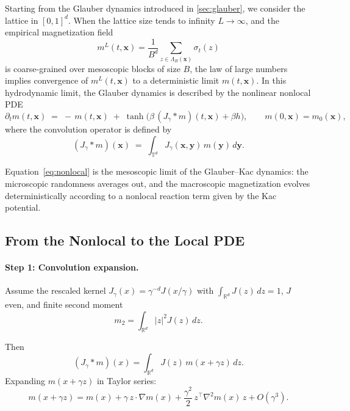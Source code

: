 \documentclass[11pt,a4paper]{article}
\begin{document}
Starting from the Glauber dynamics introduced in \cref{sec:glauber}, we consider the lattice in $[0,1]^d$. When the lattice size tends to infinity $L\to\infty$, and the empirical magnetization field
\begin{equation}
    m^L(t,\mathbf{x}) = \frac{1}{B^d}\sum_{z\in \Lambda_B(\mathbf{x})} \sigma_t(z)
\end{equation}
is coarse-grained over mesoscopic blocks of size $B$, the law of large numbers implies convergence of $m^L(t,\mathbf{x})$ to a deterministic limit $m(t,\mathbf{x})$. 
In this hydrodynamic limit, the Glauber dynamics is described by the nonlinear nonlocal PDE
\begin{equation}\label{eq:nonlocal}
    \partial_t m(t,\mathbf{x}) \;=\; -\,m(t,\mathbf{x})\;+\;\tanh\!\Big(\beta\, (J_\gamma * m)(t,\mathbf{x}) + \beta h\Big), 
    \qquad m(0,\mathbf{x})=m_0(\mathbf{x}),
\end{equation}
where the convolution operator is defined by
\begin{equation}
    \label{eq:convolution}
    (J_\gamma * m)(\mathbf{x}) \;=\; \int_{\mathbb{T}^d} J_\gamma(\mathbf{x},\mathbf{y})\,m(\mathbf{y})\,d\mathbf{y}.
\end{equation}

Equation~\eqref{eq:nonlocal} is the mesoscopic limit of the Glauber--Kac dynamics: 
the microscopic randomness averages out, and the macroscopic magnetization evolves deterministically according to a nonlocal reaction term given by the Kac potential.

\subsection{From the Nonlocal to the Local PDE}\paragraph{Step 1: Convolution expansion.}
Assume the rescaled kernel $J_\gamma(x) = \gamma^{-d} J(x/\gamma)$ with $\int_{\mathbb{R}^d} J(z)\,dz = 1$, $J$ even, and finite second moment 
\begin{equation}
m_2 = \int_{\mathbb{R}^d} |z|^2 J(z)\,dz.
\end{equation}

Then
\begin{equation}
    (J_\gamma * m)(x) = \int_{\mathbb{R}^d} J(z)\, m(x+\gamma z)\,dz.
\end{equation}
Expanding $m(x+\gamma z)$ in Taylor series:
\begin{equation}
m(x+\gamma z) = m(x) + \gamma\, z\cdot \nabla m(x) 
+ \frac{\gamma^2}{2}\, z^\top \nabla^2 m(x)\, z + O(\gamma^3).
\end{equation}
\end{document}
